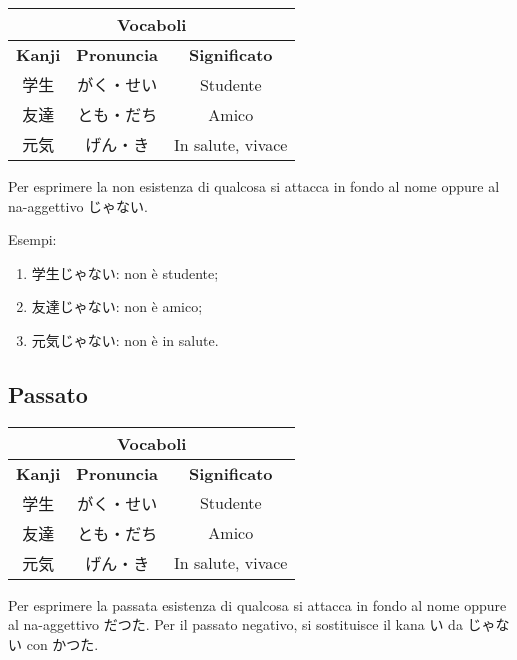 \documentclass{article}
\let\ita\textitalian
\let\jap\textjapanese
\newcommand{\itabf}[1]{\ita{\textbf{#1}}}
\newenvironment{tabVoc}{\begin{center}\begin{japanese}\begin{longtable}{|c|c|c|}}{\end{longtable}\end{japanese}\end{center}}
\begin{document}
            \begin{tabVoc}
                \hline
                \multicolumn{3}{|c|}{\itabf{Vocaboli}}\\
                \hline
                \itabf{Kanji} & \itabf{Pronuncia} & \itabf{Significato}\\
                \hline\hline
                学生 & がく・せい & \ita{Studente}\\
                \hline
                友達 & とも・だち & \ita{Amico}\\
                \hline
                元気 & げん・き & \ita{In salute, vivace}\\
                \hline
            \end{tabVoc}

            Per esprimere la non esistenza di qualcosa si attacca in fondo al nome oppure al na-aggettivo \jap{じゃない}.

            Esempi:
            \begin{enumerate}
                \item \jap{学生じゃない}: non è studente;
                \item \jap{友達じゃない}: non è amico;
                \item \jap{元気じゃない}: non è in salute.
            \end{enumerate}

        \subsection{Passato}

            \begin{tabVoc}
                \hline
                \multicolumn{3}{|c|}{\itabf{Vocaboli}}\\
                \hline
                \itabf{Kanji} & \itabf{Pronuncia} & \itabf{Significato}\\
                \hline\hline
                学生 & がく・せい & \ita{Studente}\\
                \hline
                友達 & とも・だち & \ita{Amico}\\
                \hline
                元気 & げん・き & \ita{In salute, vivace}\\
                \hline
            \end{tabVoc}

            Per esprimere la passata esistenza di qualcosa si attacca in fondo al nome oppure al na-aggettivo \jap{だつた}. Per il passato
            negativo, si sostituisce il kana \jap{い} da \jap{じゃない} con \jap{かつた}.
\end{document}

